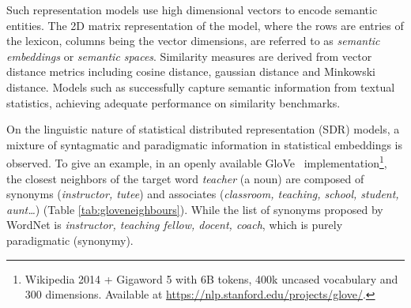 Such representation models use high dimensional vectors to encode semantic entities. The 2D matrix representation of the model, where the rows are entries of the lexicon, columns being the vector dimensions, are referred to as \emph{semantic embeddings} or \emph{semantic spaces}. Similarity measures are derived from vector distance metrics including cosine distance, gaussian distance and Minkowski distance. Models such as \textcite{penningtonGloveGlobalVectors2014, mikolovEfficientEstimationWord2013} successfully capture semantic information from textual statistics, achieving adequate performance on similarity benchmarks. 

On the linguistic nature of statistical distributed representation (SDR) models, a mixture of syntagmatic and paradigmatic information in statistical embeddings is observed. To give an example, in an openly available GloVe~\parencite{penningtonGloveGlobalVectors2014} implementation\footnote{Wikipedia 2014 + Gigaword 5 with 6B tokens, 400k uncased vocabulary and 300 dimensions. Available at \url{https://nlp.stanford.edu/projects/glove/}.}, the closest neighbors of the target word \emph{teacher} (a noun) are composed of synonyms (\emph{instructor, tutee}) and associates (\emph{classroom, teaching, school, student, aunt\dots}) (Table \ref{tab:gloveneighbours}).  While the list of synonyms proposed by WordNet is \emph{instructor, teaching fellow, docent, coach}, which is purely paradigmatic (synonymy).


